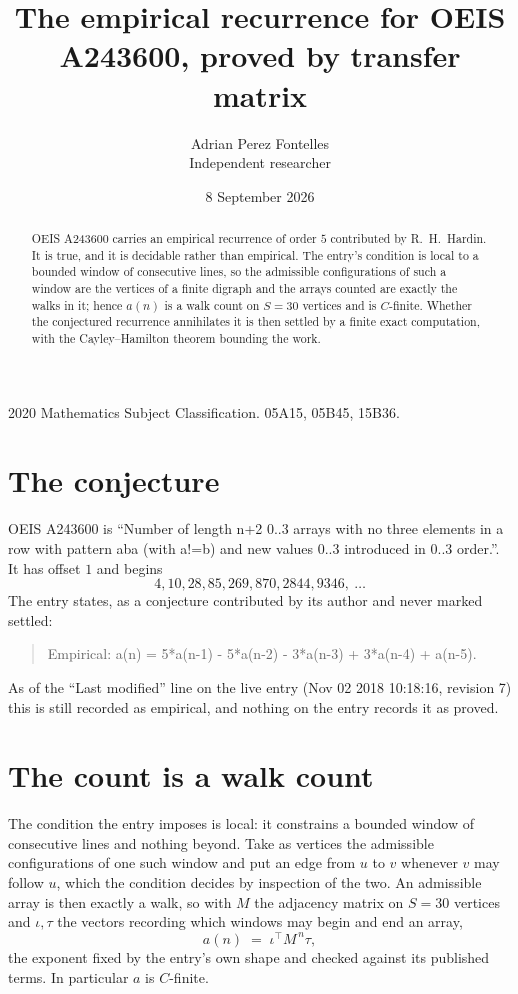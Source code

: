 \documentclass[11pt,a4paper]{article}
\title{The empirical recurrence for OEIS A243600, proved by transfer matrix}
\author{Adrian Perez Fontelles\\ \small Independent researcher}
\date{8 September 2026}
\theoremstyle{plain}
\theoremstyle{definition}
\begin{document}
\maketitle

\begin{abstract}
OEIS A243600 carries an empirical recurrence of order $5$ contributed by R.~H.~Hardin. It is
true, and it is decidable rather than empirical. The entry's condition is local to a bounded window of consecutive lines, so
the admissible configurations of such a window are the vertices of a finite digraph and the
arrays counted are exactly the walks in it; hence $a(n)$ is a walk count on $S=30$ vertices
and is $C$-finite. Whether the conjectured recurrence annihilates it is then settled by a
finite exact computation, with the Cayley--Hamilton theorem bounding the work.
\end{abstract}

\noindent\small 2020 Mathematics Subject Classification. 05A15, 05B45, 15B36.\normalsize

\section{The conjecture}

OEIS A243600 is ``Number of length n+2 0..3 arrays with no three elements in a row with pattern aba (with a!=b) and new values 0..3 introduced in 0..3 order.''. It has offset $1$ and begins
\[
4, 10, 28, 85, 269, 870, 2844, 9346,\ \dots
\]
The entry states, as a conjecture contributed by its author and never marked settled:
\begin{quote}
Empirical: a(n) = 5*a(n-1) - 5*a(n-2) - 3*a(n-3) + 3*a(n-4) + a(n-5).
\end{quote}
As of the ``Last modified'' line on the live entry (Nov 02 2018 10:18:16, revision 7) this is still
recorded as empirical, and nothing on the entry records it as proved.

\section{The count is a walk count}

The condition the entry imposes is local: it constrains a bounded window of consecutive lines and nothing beyond. Take as
vertices the admissible configurations of one such window and put an edge from $u$ to $v$
whenever $v$ may follow $u$, which the condition decides by inspection of the two. An
admissible array is then exactly a walk, so with $M$ the adjacency matrix on $S=30$ vertices
and $\iota,\tau$ the vectors recording which windows may begin and end an array,
\[
a(n)\;=\;\iota^{\!\top}M^{\,n}\tau ,
\]
the exponent fixed by the entry's own shape and checked against its published terms. In
particular $a$ is $C$-finite.
\end{document}

